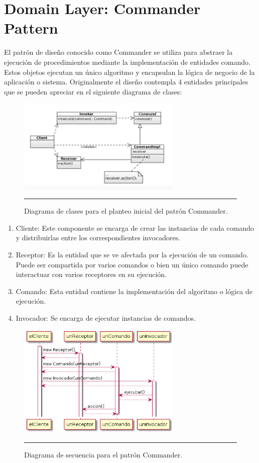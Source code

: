 \section{Domain Layer: Commander Pattern}
El patrón de diseño conocido como Commander se utiliza para abstraer la ejecución de procedimientos mediante la implementación de entidades comando. Estos objetos ejecutan un único algoritmo y encapsulan la lógica de negocio de la aplicación o sistema.
Originalmente el diseño contempla 4 entidades principales que se pueden apreciar en el siguiente diagrama de clases:

\begin{figure}[htbp]
	\centering
	\includegraphics[width=0.7\textwidth]{Figures/uml_clases_commander.png}
	\rule{35em}{1pt}
	\caption[Commander Classes]{Diagrama de clases para el planteo inicial del patrón Commander.}
	\label{fig:uml_clases_commander}
\end{figure}

\begin{enumerate}
	\item Cliente: Este componente se encarga de crear las instancias de cada comando y distribuirlas entre los correspondientes invocadores.
	\item Receptor: Es la entidad que se ve afectada por la ejecución de un comando. Puede ser compartida por varios comandos o bien un único comando puede interactuar con varios receptores en su ejecución.
	\item Comando: Esta entidad contiene la implementación del algoritmo o lógica de ejecución.
	\item Invocador: Se encarga de ejecutar instancias de comandos.
\end{enumerate}

\begin{figure}[htbp]
	\centering
	\includegraphics[width=0.7\textwidth]{Figures/uml_sequence_commander.png}
	\rule{35em}{1pt}
	\caption[MVP Components]{Diagrama de secuencia para el patrón Commander.}
	\label{fig:uml_commander_sequence}
\end{figure}

